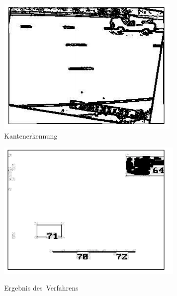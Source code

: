 \begin{figure}[ht]
  \centering
	\begin{minipage}[b]{0.4\textwidth}
     \includegraphics[width=\textwidth]{Bilder/gupte1} \\
   \caption{Kantenerkennung}
   \label{fig:gupte1}
  \end{minipage}
	\hfill
	\begin{minipage}[b]{0.4\textwidth}
     \includegraphics[width=\textwidth]{Bilder/gupte2} \\
		\caption{Ergebnis des~\newline Verfahrens}
		\label{fig:gupte2}
	\end{minipage}
\end{figure}
\newpage

